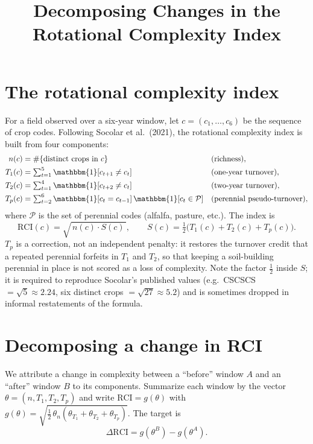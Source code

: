 \documentclass[11pt]{article}
\title{Decomposing Changes in the Rotational Complexity Index}
\author{}
\date{}
\newcommand{\ind}{\mathbbm{1}}
\newcommand{\RCI}{\mathrm{RCI}}
\begin{document}
\maketitle

\section{The rotational complexity index}

For a field observed over a six-year window, let $c=(c_1,\dots,c_6)$ be the
sequence of crop codes. Following Socolar et al.\ (2021), the rotational
complexity index is built from four components:
\begin{align}
n(c)   &= \#\{\text{distinct crops in } c\} && \text{(richness)},\\
T_1(c) &= \textstyle\sum_{t=1}^{5}\ind[c_{t+1}\neq c_t] && \text{(one-year turnover)},\\
T_2(c) &= \textstyle\sum_{t=1}^{4}\ind[c_{t+2}\neq c_t] && \text{(two-year turnover)},\\
T_p(c) &= \textstyle\sum_{t=2}^{6}\ind[c_t=c_{t-1}]\,\ind[c_t\in\mathcal{P}]
          && \text{(perennial pseudo-turnover)},
\end{align}
where $\mathcal{P}$ is the set of perennial codes (alfalfa, pasture, etc.).
The index is
\begin{equation}
\RCI(c)=\sqrt{\,n(c)\cdot S(c)\,},
\qquad
S(c)=\tfrac{1}{2}\bigl(T_1(c)+T_2(c)+T_p(c)\bigr).
\label{eq:rci}
\end{equation}
$T_p$ is a correction, not an independent penalty: it restores the turnover
credit that a repeated perennial forfeits in $T_1$ and $T_2$, so that keeping a
soil-building perennial in place is not scored as a loss of complexity. Note the
factor $\tfrac12$ inside $S$; it is required to reproduce Socolar's published
values (e.g.\ CSCSCS $=\sqrt5\approx2.24$, six distinct crops $=\sqrt{27}\approx5.2$)
and is sometimes dropped in informal restatements of the formula.

\section{Decomposing a change in RCI}

We attribute a change in complexity between a ``before'' window $A$ and an
``after'' window $B$ to its components. Summarize each window by the vector
$\theta=(n,T_1,T_2,T_p)$ and write $\RCI = g(\theta)$ with
$g(\theta)=\sqrt{\tfrac12\,\theta_n(\theta_{T_1}+\theta_{T_2}+\theta_{T_p})}$.
The target is
\begin{equation}
\Delta\RCI = g(\theta^B)-g(\theta^A).
\end{equation}
\end{document}
